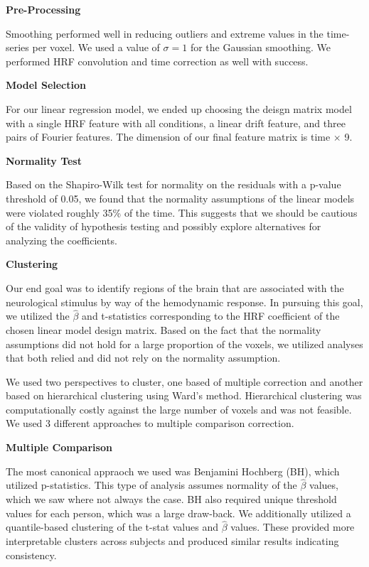 

\noindent \textbf{Pre-Processing}

Smoothing performed well in reducing outliers and extreme values in the time-series per voxel. We used a value of $\sigma=1$ for the Gaussian smoothing.  We performed HRF convolution and time correction as well with success.
\vspace{5mm}

\noindent \textbf{Model Selection}

For our linear regression model, we ended up choosing the deisgn matrix model with a single HRF feature with all conditions, a linear drift feature, and three pairs of Fourier features. The dimension of our final feature matrix is time $\times$ 9. 
\vspace{5mm}

\noindent \textbf{Normality Test}

Based on the Shapiro-Wilk test for normality on the residuals with a p-value threshold of 0.05, we found that the normality assumptions of the linear models were violated roughly 35\% of the time. This suggests that we should be cautious of the validity of hypothesis testing and possibly explore alternatives for analyzing the coefficients.
\vspace{5mm}

\noindent \textbf{Clustering}

Our end goal was to identify regions of the brain that are associated with the neurological stimulus by way of the hemodynamic response. In pursuing this goal, we utilized the $\hat{\beta}$ and t-statistics corresponding to the HRF coefficient of the chosen linear model design matrix. Based on the fact that the normality assumptions did not hold for a large proportion of the voxels, we utilized analyses that both relied and did not rely on the normality assumption.

We used two perspectives to cluster, one based of multiple correction and another based on hierarchical clustering using Ward's method. Hierarchical clustering was computationally costly against the large number of voxels and was not feasible. We used 3 different approaches to multiple comparison correction. 
\vspace{5mm}

\noindent \textbf{Multiple Comparison}

The most canonical appraoch we used was Benjamini Hochberg (BH), which utilized p-statistics. This type of analysis assumes normality of the $\hat{\beta}$ values, which we saw where not always the case. BH also required unique threshold values for each person, which was a large draw-back. We additionally utilized a quantile-based clustering of the t-stat values and $\hat{\beta}$ values. These provided more interpretable clusters across subjects and produced similar results indicating consistency.
\vspace{5mm}

